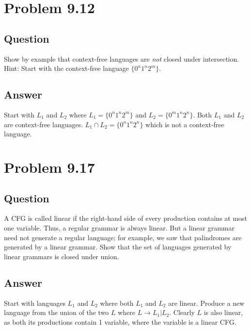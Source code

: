 \documentclass[12pt, a4paper]{article}
\begin{document}
\section{Problem 9.12}
\subsection{Question}
Show by example that context-free languages are \textit{not} closed under intersection. Hint: Start with the context-free language $\{0^{n}1^{n}2^{m}\}$.
\subsection{Answer}
Start with $L_{1}$ and $L_{2}$ where $L_{1} = \{0^{n}1^{n}2^{m}\}$ and $L_{2} = \{0^{m}1^{n}2^{n}\}$. Both $L_{1}$ and $L_{2}$ are context-free languages. $L_{1} \cap L_{2} = \{0^{n}1^{n}2^{n}\}$ which is not a context-free language.

\section{Problem 9.17}
\subsection{Question}
A CFG is called linear if the right-hand side of every production contains at most one variable. Thus, a regular grammar is always linear. But a linear grammar need not generate a regular language; for example, we saw that palindromes are generated by a linear grammar. Show that the set of languages generated by linear grammars is closed under union.
\subsection{Answer}
Start with languages $L_{1}$ and $L_{2}$ where both $L_{1}$ and $L_{2}$ are linear. Produce a new language from the union of the two $L$ where $L \to L_{1} | L_{2}$. Clearly $L$ is also linear, as both its productions contain 1 variable, where the variable is a linear CFG.
\end{document}

